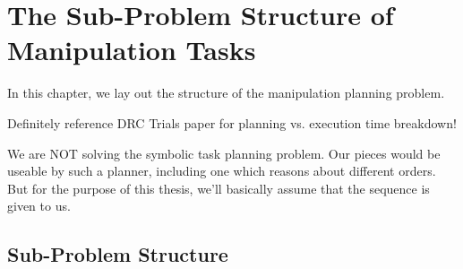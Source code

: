 \chapter{The Sub-Problem Structure of Manipulation Tasks}
\label{chap:formulation}

In this chapter,
we lay out the structure of the manipulation planning problem.

Definitely reference DRC Trials paper for planning vs. execution
time breakdown!

We are NOT solving the symbolic task planning problem.
Our pieces would be useable by such a planner,
including one which reasons about different orders.
But for the purpose of this thesis,
we'll basically assume that the sequence is given to us.

\section{Sub-Problem Structure}

